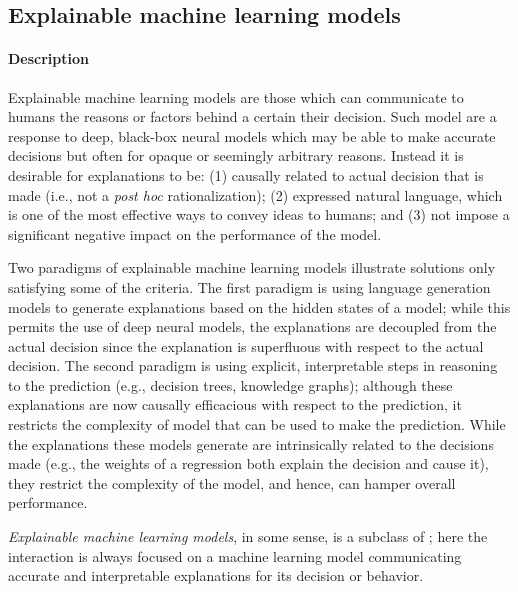 \subsection{Explainable machine learning models}%
\label{sec:rev-explainable-models}
\paragraph{Description}
Explainable machine learning models are those which can communicate to humans the reasons or factors behind a certain their decision.
Such model are a response to deep, black-box neural models which may be able to make accurate decisions but often for opaque or seemingly arbitrary reasons.
Instead it is desirable for explanations to be:
  (1) causally related to actual decision that is made (i.e., not a \emph{post hoc} rationalization);
  (2) expressed natural language, which is one of the most effective ways to convey ideas to humans;
  and (3) not impose a significant negative impact on the performance of the model.

Two paradigms of explainable machine learning models illustrate solutions only satisfying some of the criteria.
The first paradigm is using language generation models to generate explanations based on the hidden states of a model; while this permits the use of deep neural models, the explanations are decoupled from the actual decision since the explanation is superfluous with respect to the actual decision.
The second paradigm is using explicit, interpretable steps in reasoning to the prediction (e.g., decision trees, knowledge graphs); although these explanations are now causally efficacious with respect to the prediction, it restricts the complexity of model that can be used to make the prediction.
While the explanations these models generate are intrinsically related to the decisions made (e.g., the weights of a regression both explain the decision and cause it), they restrict the complexity of the model, and hence, can hamper overall performance.


\emph{Explainable machine learning models}, in some sense, is a subclass of ; here the interaction is always focused on a machine learning model communicating accurate and interpretable explanations for its decision or behavior.


